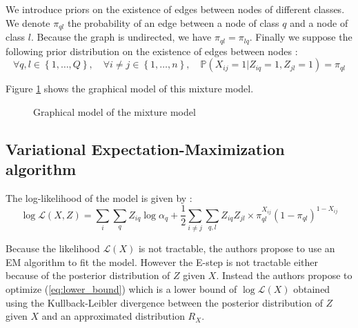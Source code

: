 \documentclass[11pt]{article}
\begin{document}
We introduce priors on the existence of edges between nodes of different classes. We denote $\pi_{ql}$ the probability of an edge between a node of class $q$ and a node of class $l$. Because the graph is undirected, we have $\pi_{ql}=\pi_{lq}$. Finally we suppose the following prior distribution on the existence of edges between nodes :
\begin{equation}
    \forall q,l\in \left\{1,\dots,Q\right\}, \quad \forall i\neq j\in \left\{1,\dots,n\right\}, \quad \mathbb{P}(X_{ij}=1|Z_{iq}=1,Z_{jl}=1)=\pi_{ql}
\end{equation}

Figure \ref{fig:graphical_model} shows the graphical model of this mixture model.

\begin{figure}[H]
    \centering
    \label{fig:graphical_model}
    \caption{Graphical model of the mixture model}
\end{figure}


\subsection{Variational Expectation-Maximization algorithm}

The log-likelihood of the model is given by :
\begin{equation}
    \log \mathcal{L}(X, Z) = \sum_{i}\sum_{q} Z_{iq}\log\alpha_q + \frac{1}{2}\sum_{i\neq j}\sum_{q,l} Z_{iq}Z_{jl} \times \pi_{ql}^{X_{ij}}(1-\pi_{ql})^{1-X_{ij}}
\end{equation}

Because the likelihood $\mathcal{L}(X)$ is not tractable, the authors propose to use an EM algorithm to fit the model. However the E-step is not tractable either because of the posterior distribution of $Z$ given $X$. Instead the authors propose to optimize (\ref{eq:lower_bound}) which is a lower bound of $\log\mathcal{L}(X)$ obtained using the Kullback-Leibler divergence between the posterior distribution of $Z$ given $X$ and an approximated distribution $R_X$.
\end{document}
